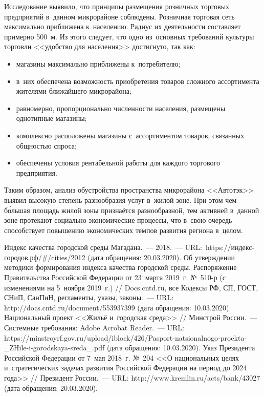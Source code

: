 Исследование выявило, что принципы размещения розничных торговых предприятий в~данном микрорайоне соблюдены. Розничная торговая сеть максимально приближена к~населению. Радиус их деятельности составляет примерно 500~м. Из этого следует, что одно из~основных требований культуры торговли <<удобство для населения>> достигнуто, так как:
\begin{itemize}[noitemsep]\vspace{-8pt}
\item магазины максимально приближены к~потребителю;
\item в~них обеспечена возможность приобретения товаров сложного ассортимента жителями ближайшего микрорайона;
\item равномерно, пропорционально численности населения, размещены однотипные магазины;
\item комплексно расположены магазины с~ассортиментом товаров, связанных общностью спроса;
\item обеспечены условия рентабельной работы для каждого торгового предприятия.
\end{itemize}\vspace{-8pt}

Таким образом, анализ обустройства пространства микрорайона <<Автотэк>> выявил высокую степень разнообразия услуг в~жилой зоне. При этом чем б\'{о}льшая площадь жилой зоны признаётся разнообразной, тем активней в~данной зоне протекают социально-экономические процессы, что в~свою очередь способствует повышению экономических темпов развития региона в~целом.\enlargethispage{\baselineskip}


\begin{thebibliography}{99}
\bibitem{}Индекс качества городской среды Магадана.~--- 2018.~--- URL:~https://индекс-городов.рф/\#/cities/2012 (дата обращения: 20.03.2020).
\bibitem{}Об утверждении методики формирования индекса качества городской среды. Распоряжение Правительства Российской Федерации от 23~марта 2019~г. №~510-р (с изменениями на 5~ноября 2019~г.) // Docs.cntd.ru, все Кодексы РФ, СП, ГОСТ, СНиП, СанПиН, регламенты, указы, законы.~--- URL: http://docs.cntd.ru/document/553937399 (дата обращения: 10.03.2020).
\bibitem{}Национальный проект <<Жильё и~городская среда>> // Минстрой России.~--- Системные требования: Adobe Acrobat Reader.~--- URL: https://minstroyrf.gov.ru/upload/iblock/426/Pasport-natsionalnogo-proekta-\_ZHile-i-gorodskaya-sreda\_.pdf (дата обращения: 10.03.2020).
\bibitem{}Указ Президента Российской Федерации от 7~мая 2018~г. №~204 <<О национальных целях и~стратегических задачах развития Российской Федерации на период до 2024 года>> // Президент России.~--- URL: http://www.kremlin.ru/acts/bank/43027 (дата обращения: 20.03.2020).

\end{thebibliography}
